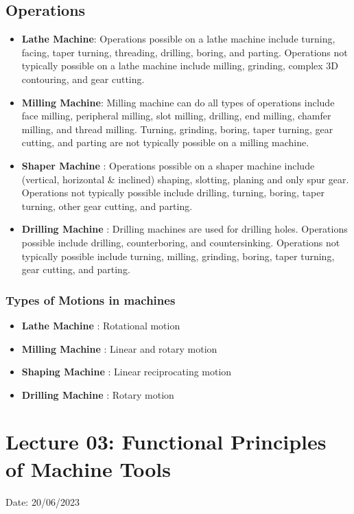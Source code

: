 \documentclass{article}
\begin{document}
\subsection*{Operations}
\begin{itemize}
  \item \textbf{Lathe Machine}: Operations possible on a lathe machine include turning, facing, taper turning, threading, drilling, boring, and parting. Operations not typically possible on a lathe machine include milling, grinding, complex 3D contouring, and gear cutting.
  \item \textbf{Milling Machine}: Milling machine can do all types of operations include face milling, peripheral milling, slot milling, drilling, end milling, chamfer milling, and thread milling. Turning, grinding, boring, taper turning, gear cutting, and parting are not typically possible on a milling machine.
  \item \textbf{Shaper Machine} : Operations possible on a shaper machine include (vertical, horizontal \& inclined) shaping, slotting, planing and only spur gear. Operations not typically possible include drilling, turning, boring, taper turning, other gear cutting, and parting.
  \item \textbf{Drilling Machine} : Drilling machines are used for drilling holes. Operations possible include drilling, counterboring, and countersinking. Operations not typically possible include turning, milling, grinding, boring, taper turning, gear cutting, and parting.
\end{itemize}

\subsubsection*{Types of Motions in machines}
\begin{itemize}
  \item \textbf{Lathe Machine} :  Rotational motion
  \item \textbf{Milling Machine} : Linear and rotary motion
  \item \textbf{Shaping Machine} : Linear reciprocating motion
  \item \textbf{Drilling Machine} : Rotary motion
\end{itemize}
\vspace*{1cm}

\section{Lecture 03: Functional Principles of Machine Tools} 
\hfill Date: 20/06/2023
\end{document}
